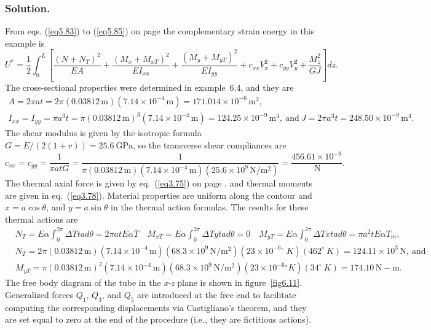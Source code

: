 \documentclass{AeroStructure-ERJohnson}
\begin{document}
\begin{example*}
\subsubsection{Solution.} From eqs. (\ref{eq5.83}) to (\ref{eq5.85}) on page \pageref{eq5.83} the complementary strain energy in this example is
\begin{equation*}
U^{*}=\frac{1}{2} \int_{0}^{L}\left[\frac{\left(N+N_{T}\right)^{2}}{E A}+\frac{\left(M_{x}+M_{x T}\right)^{2}}{E I_{x x}}+\frac{\left(M_{y}+M_{y T}\right)^{2}}{E I_{y y}}+c_{x x} V_{x}^{2}+c_{y y} V_{y}^{2}+\frac{M_{z}^{2}}{G J}\right] d z.\tag{b}
\end{equation*}
The cross-sectional properties were determined in example~6.4, and they are
\begin{gather*}
A=2 \pi a t=2 \pi(0.03812\,\mathrm{m})(7.14 \times 10^{-4}\,\mathrm{m})=171.014 \times 10^{-6}\,\mathrm{m}^{2},
\tag{c}\\
I_{x x}=I_{y y}=\pi a^{3} t=\pi(0.03812\,\mathrm{m})^{3}(7.14 \times 10^{-4}\,\mathrm{m})=124.25 \times 10^{-9}\,\mathrm{m}^{4},\ \text{and}\ J=2 \pi a^{3} t=248.50 \times 10^{-9}\,\mathrm{m}^{4}.\tag{d}
\end{gather*}
The shear modulus is given by the isotropic formula $G=E /(2(1+v))=25.6~\mathrm{GPa}$, so the transverse shear compliances are
\begin{equation*}
c_{x x}=c_{y y}=\frac{1}{\pi a t G}=\frac{1}{\pi(0.03812\,\mathrm{m})\left(7.14 \times 10^{-4}\,\mathrm{m}\right)\left(25.6 \times 10^{9}\,\mathrm{N} / \mathrm{m}^{2}\right)}=\frac{456.61 \times 10^{-9}}{\mathrm{~N}}.\tag{e}
\end{equation*}
The thermal axial force is given by eq.~(\ref{eq3.75}) on page \pageref{eq3.75}, and thermal moments are given in eq.~(\ref{eq3.78}). Material properties are uniform along the contour and $x=a \cos \theta$, and $y=a \sin \theta$ in the thermal action formulas. The results for these thermal actions are
\begin{align*}
&N_{T}=E \alpha \int_{0}^{2 \pi} \Delta T t a d \theta=2 \pi a t E \alpha \bar{T} \quad M_{x T}=E \alpha \int_{0}^{2 \pi} \Delta T y t a d \theta=0 \quad M_{y T}=E \alpha \int_{0}^{2 \pi} \Delta T x t a d \theta=\pi a^{2} t E \alpha T_{m},&\tag{f} \\
&N_{T}=2 \pi(0.03812\,\mathrm{m})(7.14 \times 10^{-4}\,\mathrm{m})(68.3 \times 10^{9}\,\mathrm{N} / \mathrm{m}^{2})(23 \times 10^{-6}{}^{\circ} ~K)(462^{\circ}~K)=124.11 \times 10^{3}\,\mathrm{N},\ \text{and}& \tag{g} \\
&M_{y T}=\pi(0.03812\,\mathrm{m})^{2}(7.14 \times 10^{-4}\,\mathrm{m})(68.3 \times 10^{9}\,\mathrm{N} / \mathrm{m}^{2})(23 \times 10^{-6}{ }^{\circ} K)(34^{\circ} ~K)=174.10\,\mathrm{N}-\mathrm{m}.&\tag{h}
\end{align*}
The free body diagram of the tube in the \textit{x-z} plane is shown in figure~\ref{fig6.11}. Generalized forces $Q_1$, $Q_3$, and $Q_5$ are introduced at the free end to facilitate computing the corresponding displacements via Castigliano's theorem, and they are set equal to zero at the end of the procedure (i.e., they are fictitious actions).


\end{example*}
\end{document}
